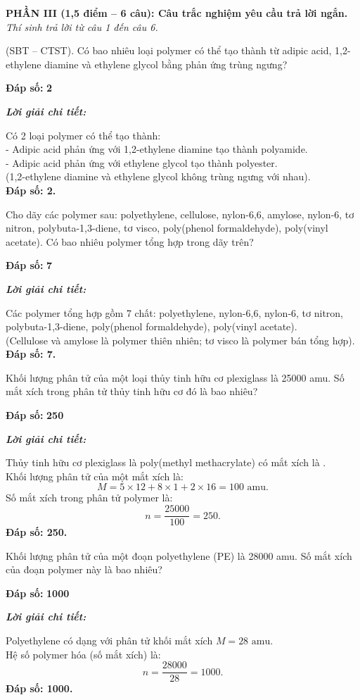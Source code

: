 \documentclass[11pt,a4paper]{article}
\def\loigiai#1{
\par\begingroup\color{blue!80!black}\small
\noindent\textbf{\textit{Lời giải chi tiết:}}\par
#1\par\endgroup}
\begin{document}
\noindent
\textbf{PHẦN III (1,5 điểm -- 6 câu): Câu trắc nghiệm yêu cầu trả lời ngắn.}\\
\textit{Thí sinh trả lời từ câu 1 đến câu 6.}

\setcounter{ex}{0}

\begin{ex}
(SBT -- CTST). Có bao nhiêu loại polymer có thể tạo thành từ adipic acid, 1,2-ethylene diamine và ethylene glycol bằng phản ứng trùng ngưng?
\par\noindent\textbf{Đáp số:} \textbf{\color{red}2}
\loigiai{
Có 2 loại polymer có thể tạo thành:\\
- Adipic acid phản ứng với 1,2-ethylene diamine tạo thành polyamide.\\
- Adipic acid phản ứng với ethylene glycol tạo thành polyester.\\
(1,2-ethylene diamine và ethylene glycol không trùng ngưng với nhau).\\
\textbf{Đáp số: 2.}}
\end{ex}

\begin{ex}
Cho dãy các polymer sau: polyethylene, cellulose, nylon-6,6, amylose, nylon-6, tơ nitron, polybuta-1,3-diene, tơ visco, poly(phenol formaldehyde), poly(vinyl acetate). Có bao nhiêu polymer tổng hợp trong dãy trên?
\par\noindent\textbf{Đáp số:} \textbf{\color{red}7}
\loigiai{
Các polymer tổng hợp gồm 7 chất: polyethylene, nylon-6,6, nylon-6, tơ nitron, polybuta-1,3-diene, poly(phenol formaldehyde), poly(vinyl acetate).\\
(Cellulose và amylose là polymer thiên nhiên; tơ visco là polymer bán tổng hợp).\\
\textbf{Đáp số: 7.}}
\end{ex}

\begin{ex}
Khối lượng phân tử của một loại thủy tinh hữu cơ plexiglass là 25000 amu. Số mắt xích trong phân tử thủy tinh hữu cơ đó là bao nhiêu?
\par\noindent\textbf{Đáp số:} \textbf{\color{red}250}
\loigiai{
Thủy tinh hữu cơ plexiglass là poly(methyl methacrylate) có mắt xích là \ce{[-CH2-C(CH3)(COOCH3)-]}.\\
Khối lượng phân tử của một mắt xích là:
$$M = 5 \times 12 + 8 \times 1 + 2 \times 16 = 100\text{ amu.}$$
Số mắt xích trong phân tử polymer là:
$$n = \frac{25000}{100} = 250.$$
\textbf{Đáp số: 250.}}
\end{ex}

\begin{ex}
Khối lượng phân tử của một đoạn polyethylene (PE) là 28000 amu. Số mắt xích của đoạn polymer này là bao nhiêu?
\par\noindent\textbf{Đáp số:} \textbf{\color{red}1000}
\loigiai{
Polyethylene có dạng  với phân tử khối mắt xích $M = 28\text{ amu}$.\\
Hệ số polymer hóa (số mắt xích) là:
$$n = \frac{28000}{28} = 1000.$$
\textbf{Đáp số: 1000.}}
\end{ex}
\end{document}
